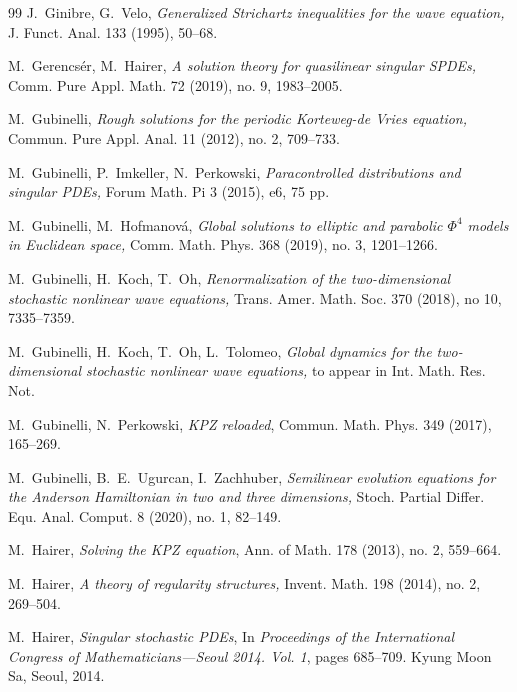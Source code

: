 \documentclass[%
11pt,  reqno]{amsart}
\newcommand{\1}{\hspace{0.2mm}\text{I}\hspace{0.2mm}}
\numberwithin{equation}{section}
\numberwithin{theorem}{section}
\begin{document}
\begin{thebibliography}{99}
J.~Ginibre, G.~Velo, 
{\it Generalized Strichartz inequalities for the wave equation,} J. Funct. Anal. 133 (1995),
50--68.




M.~Gerencs\'er, M.~Hairer,
{\it  A solution theory for quasilinear singular {SPDEs},}
 Comm. Pure Appl. Math. 72 (2019), no. 9, 1983--2005.


M.~Gubinelli,
{\it Rough solutions for the periodic Korteweg-de Vries equation,}
 Commun. Pure Appl. Anal. 11 (2012), no. 2, 709--733.

M.~Gubinelli, P.~Imkeller, N.~Perkowski, 
{\it Paracontrolled distributions and singular PDEs,} Forum Math. Pi 3 (2015), e6, 75 pp. 


M.~Gubinelli, M.~Hofmanov\'a, 
{\it Global solutions to elliptic and parabolic $\Phi^4$ models in Euclidean space,}
 Comm. Math. Phys. 368 (2019), no. 3, 1201--1266.

M.~Gubinelli, H.~Koch, T.~Oh,
{\it  Renormalization of the two-dimensional stochastic nonlinear wave equations,}
 Trans. Amer. Math. Soc.
 370 (2018), no 10, 7335--7359.
 
M.~Gubinelli, H.~Koch, T.~Oh, L.~Tolomeo,
{\it Global dynamics for  the two-dimensional stochastic nonlinear wave equations,}
to appear in Int. Math. Res. Not.





M.~Gubinelli, N.~Perkowski, 
{\it   KPZ reloaded},
Commun. Math. Phys. 349 (2017), 165--269.


M.~Gubinelli, B.~E.~Ugurcan,  I.~Zachhuber,
{\it Semilinear evolution equations for the {Anderson} {Hamiltonian} in
  two and three dimensions,}
 Stoch. Partial Differ. Equ. Anal. Comput. 8 (2020), no. 1, 82--149. 


M.~Hairer, 
{\it Solving the KPZ equation}, Ann. of Math.  178 (2013), no. 2, 559--664. 

M.~Hairer, 
{\it A theory of regularity structures,} Invent. Math. 198 (2014), no. 2, 269--504. 


M.~Hairer,
{\it Singular stochastic {PDE}s},
In {\em Proceedings of the {I}nternational {C}ongress of
  {M}athematicians---{S}eoul 2014. {V}ol. 1}, pages 685--709. Kyung Moon Sa,
  Seoul, 2014.



\end{thebibliography}
\end{document}
